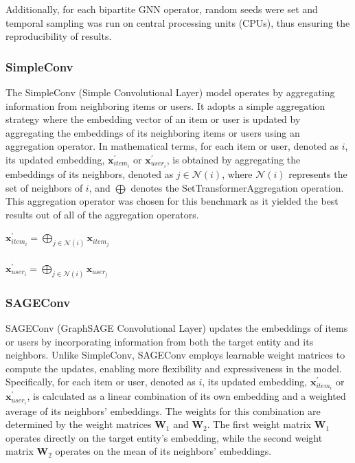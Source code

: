 \documentclass{scrartcl}
\begin{document}
Additionally, for each bipartite GNN operator, random seeds were set and temporal sampling was run on central processing units (CPUs), thus ensuring the reproducibility of results.


\subsubsection{SimpleConv}

\quad The SimpleConv (Simple Convolutional Layer) model operates by aggregating information from neighboring items or users. It adopts a simple aggregation strategy where the embedding vector of an item or user is updated by aggregating the embeddings of its neighboring items or users using an aggregation operator. In mathematical terms, for each item or user, denoted as $i$, its updated embedding, $\mathbf{x}^{\prime}_{item_i}$ or $\mathbf{x}^{\prime}_{user_i}$, is obtained by aggregating the embeddings of its neighbors, denoted as $j \in \mathcal{N}(i)$, where $\mathcal{N}(i)$ represents the set of neighbors of $i$, and $\bigoplus$ denotes the SetTransformerAggregation\cite{simpleconv} operation. This aggregation operator was chosen for this benchmark as it yielded the best results out of all of the aggregation operators. \\ 

\begin{center}
    $\mathbf{x}^{\prime}_{item_{i}} = \bigoplus_{j \in \mathcal{N}(i)} \mathbf{x}_{item_{j}}$ \\~\\
    $\mathbf{x}^{\prime}_{user_{i}} = \bigoplus_{j \in \mathcal{N}(i)} \mathbf{x}_{user_{j}}$
\end{center}

\subsubsection{SAGEConv\cite{sageconv}} 

\quad SAGEConv (GraphSAGE Convolutional Layer) updates the embeddings of items or users by incorporating information from both the target entity and its neighbors. Unlike SimpleConv, SAGEConv employs learnable weight matrices to compute the updates, enabling more flexibility and expressiveness in the model. Specifically, for each item or user, denoted as $i$, its updated embedding, $\mathbf{x}^{\prime}_{item_i}$ or $\mathbf{x}^{\prime}_{user_i}$, is calculated as a linear combination of its own embedding and a weighted average of its neighbors' embeddings. The weights for this combination are determined by the weight matrices $\mathbf{W}_1$ and $\mathbf{W}_2$. The first weight matrix $\mathbf{W}_1$ operates directly on the target entity's embedding, while the second weight matrix $\mathbf{W}_2$ operates on the mean of its neighbors' embeddings. \\ 
\end{document}
